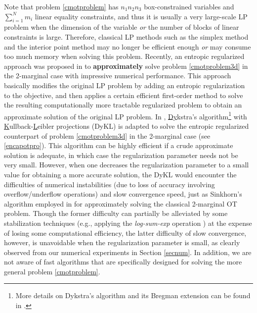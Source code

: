 \documentclass[10pt]{article}
\begin{document}

Note that problem \eqref{cmotproblem} has $n_1n_2n_3$ box-constrained variables and $\sum_{i=1}^N m_i$ linear equality constraints, and thus it is usually a very large-scale LP problem when the dimension of the variable \textit{or} the number of blocks of linear constraints is large. Therefore, classical LP methods such as the simplex method and the interior point method may no longer be efficient enough \textit{or} may consume too much memory when solving this problem. Recently, an entropic regularized approach was proposed in \cite{bccnp2015iterative} to {\bf approximately} solve problem \eqref{cmotproblem3d} in the 2-marginal case with impressive numerical performance. This approach basically modifies the original LP problem by adding an entropic regularization to the objective, and then applies a certain efficient first-order method to solve the resulting computationally more tractable regularized problem to obtain an approximate solution of the original LP problem. In \cite{bccnp2015iterative}, \underline{Dy}kstra's algorithm\footnote{More details on Dykstra's algorithm and its Bregman extension can be found in \cite{bl2000dykstras,d1983algorithm}.} with \underline{K}ullback-\underline{L}eibler projections (DyKL) is adapted to solve the entropic regularized counterpart of problem \eqref{cmotproblem3d} in the 2-marginal case (see \eqref{encapotpro}). This algorithm can be highly efficient if a crude approximate solution is adequate, in which case the regularization parameter needs not be very small.
However, when one decreases the regularization parameter to a small value for obtaining a more accurate solution, the DyKL would encounter the difficulties of numerical instabilities (due to loss of accuracy involving overflow/underflow operations) and slow convergence speed, just as Sinkhorn's algorithm \cite{s1967diagonal} employed in \cite{c2013sinkhorn} for approximately solving the classical 2-marginal OT problem. Though the former difficulty can partially be alleviated by some stabilization techniques (e.g., applying the \textit{log-sum-exp} operation \cite[Section 4.4]{pc2019computational}) at the expense of losing some computational efficiency, the latter difficulty of slow convergence, however, is unavoidable when the regularization parameter is small, as clearly observed from our numerical experiments in Section \ref{secnum}. In addition, we are not aware of fast algorithms that are specifically designed for solving the more general problem \eqref{cmotproblem}.
\end{document}
